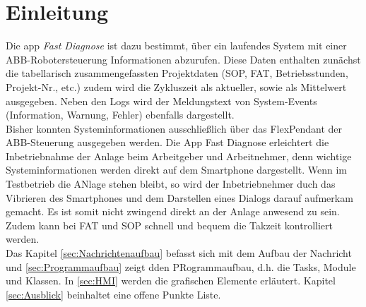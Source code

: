 \chapter{Einleitung}
%
%
Die \gls{app} \textit{Fast Diagnose} ist dazu bestimmt, über ein laufendes 
System mit einer ABB-Robotersteuerung Informationen abzurufen. Diese Daten 
enthalten zunächst die tabellarisch zusammengefassten Projektdaten (SOP, FAT, 
Betriebsstunden, Projekt-Nr., etc.) zudem wird die Zykluszeit als aktueller, 
sowie als Mittelwert ausgegeben. Neben den Logs wird der Meldungstext von 
System-Events (Information, Warnung, Fehler) ebenfalls dargestellt.\\
%
%
Bisher konnten Systeminformationen ausschließlich über das FlexPendant der 
ABB-Steuerung ausgegeben werden. Die App Fast Diagnose erleichtert die 
Inbetriebnahme der Anlage beim Arbeitgeber und Arbeitnehmer, denn wichtige 
Systeminformationen werden direkt auf dem Smartphone dargestellt. Wenn im 
Testbetrieb die ANlage stehen bleibt, so wird der Inbetriebnehmer duch das 
Vibrieren des Smartphones und dem Darstellen eines Dialogs darauf aufmerkam 
gemacht. Es ist somit nicht zwingend direkt an der Anlage anwesend zu sein.
Zudem kann bei FAT und SOP schnell und bequem die Takzeit kontrolliert werden.\\
%
%
Das Kapitel \ref{sec:Nachrichtenaufbau} befasst sich mit dem Aufbau der 
Nachricht und \ref{sec:Programmaufbau} zeigt dden PRogrammaufbau, d.h. die 
Tasks, Module und Klassen. In \ref{sec:HMI} werden die grafischen Elemente 
erläutert. Kapitel \ref{sec:Ausblick} beinhaltet eine offene Punkte Liste.